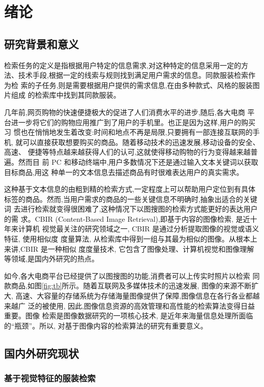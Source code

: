 \chapter{绪论}

\section{研究背景和意义}
检索任务的定义是指根据用户特定的信息需求,对这种特定的信息采用一定的方
法、技术手段,根据一定的线索与规则找到满足用户需求的信息。同款服装检索作为检
索的子任务,则是需要根据用户提供的需求信息,在由多种款式、风格的服装图片组成
的检索库中找到其同款服装。

几年前,网页购物的快速便捷极大的促进了人们消费水平的进步,随后,各大电商
平台进一步将它们的购物应用推广到了用户的手机里。也正是因为这样,用户的购买习
惯也在悄悄地发生着改变:时间和地点不再是局限,只要拥有一部连接互联网的手机,
就可以直接获取想要购买的商品。随着移动技术的迅速发展,移动设备的安全、高速、
便捷等特点越来越获得人们的认可,这就使得移动购物的行为变得越来越普遍。然而目
前 PC 和移动终端中,用户多数情况下还是通过输入文本关键词以获取目标商品,用这
种单一的文本信息去描述商品有时很难表达用户的真实需求。

这种基于文本信息的由粗到精的检索方式,一定程度上可以帮助用户定位到有具体
标签的商品。然而,当用户需求的商品的一些关键信息不明确时,抽象出适合的关键词
去进行检索就变得很困难了,这种情况下以图搜图的检索方式能更好的表达用户的需
求。CBIR (Content-Based Image Retrieval)\cite{kato1992sketch},即基于内容的图像检索, 是近十年来计算机
视觉最关注的研究领域之一, CBIR 是通过分析提取图像的视觉或语义特征, 使用相似度
度量算法, 从检索库中得到一组与其最为相似的图像。从根本上来讲,CBIR 是一种相似
度度量技术, 它包含了图像处理、计算机视觉和图像理解等领域,是国内外研究的热点。

如今,各大电商平台已经提供了以图搜图的功能,消费者可以上传实时照片以检索
同款商品,如图\ref{fig:tb}所示。随着互联网及多媒体技术的迅速发展, 图像的来源不断扩大,
高速、大容量的存储系统为存储海量图像提供了保障,图像信息在各行各业都越来越广
泛的被使用, 因此,图像信息资源的高效管理和高性能的检索算法变得日益重要。图像
检索是图像数据研究的一项核心技术, 是近年来海量信息处理所面临的“瓶颈”。所以,
对基于图像内容的检索算法的研究有重要意义。

\section{国内外研究现状}

\subsection{基于视觉特征的服装检索}


